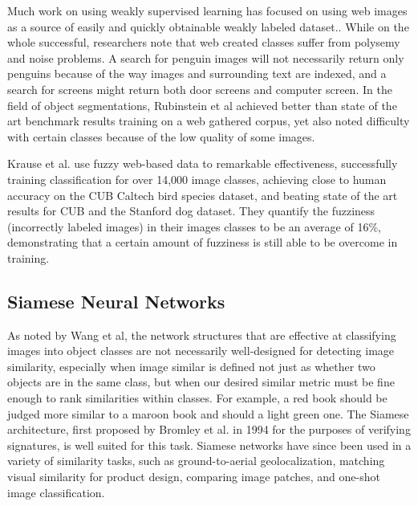 \documentclass[pageno]{jpaper}
\begin{document}
Much work on using weakly supervised learning has focused on using web images as a source of easily and quickly obtainable weakly labeled dataset.\cite{bergamo2010exploiting}\cite{fergus2010learning}\cite{li2010optimol}\cite{schroff2011harvesting}. While on the whole successful, researchers note that web created classes suffer from polysemy and noise problems. A search for penguin images will not necessarily return only penguins because of the way images and surrounding text are indexed, and a search for screens might return both door screens and computer screen. In the field of object segmentations, Rubinstein et al achieved better than state of the art benchmark results training on a web gathered corpus, yet also noted difficulty with certain classes because of the low quality of some images.\cite{rubinstein2013unsupervised}

Krause et al. use fuzzy web-based data to remarkable effectiveness, successfully training classification for over 14,000 image classes, achieving close to human accuracy on the CUB Caltech bird species dataset, and beating state of the art results for CUB and the Stanford dog dataset\cite{krause2016unreasonable}. They quantify the fuzziness (incorrectly labeled images) in their images classes to be an average of 16\%, demonstrating that a certain amount of fuzziness is still able to be overcome in training. 


\subsection{Siamese Neural Networks}

As noted by Wang et al\cite{wang2014learning}, the network structures that are effective at classifying images into object classes are not necessarily well-designed for detecting image similarity, especially when image similar is defined not just as whether two objects are in the same class, but when our desired similar metric must be fine enough to rank similarities within classes. For example, a red book should be judged more similar to a maroon book and should a light green one. The Siamese architecture, first proposed by Bromley et al. in 1994\cite{bromley1993signature} for the purposes of verifying signatures, is well suited for this task. Siamese networks have since been used in a variety of similarity tasks, such as ground-to-aerial geolocalization\cite{lin2015learning}, matching visual similarity for product design\cite{bell2015learning}, comparing image patches\cite{zagoruyko2015learning}, and one-shot image classification\cite{koch2015siamese}.\\
\end{document}
